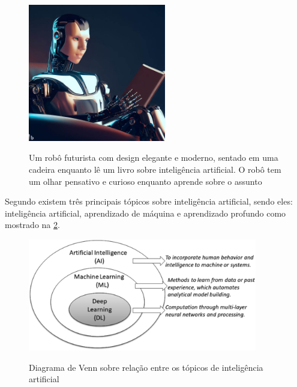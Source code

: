 \begin{figure}[ht]
	\caption{Um robô futurista com design elegante e moderno, sentado em uma cadeira enquanto lê um livro sobre inteligência artificial. O robô tem um olhar pensativo e curioso enquanto aprende sobre o assunto}
	\centering %
	\includegraphics[width=6cm]{figures/ia_concept.jpg} %
	\label{fig:ia_concept}
\end{figure}

Segundo  existem três principais tópicos sobre inteligência artificial, sendo eles: inteligência artificial, aprendizado de máquina e aprendizado profundo como mostrado na \cref{fig:diagrama_ia_ml_dp}.

\begin{figure}[ht]
	\caption{Diagrama de Venn sobre relação entre os tópicos de inteligência artificial}
	\centering %
	\includegraphics[width=10cm]{figures/diagrama_ia_ml_dp.png} %
	\label{fig:diagrama_ia_ml_dp}
\end{figure}

